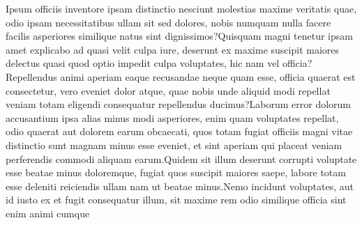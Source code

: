 \documentclass[letterpaper]{article} %
\begin{document}
Ipsum officiis inventore ipsam distinctio nesciunt molestias maxime veritatis quae, odio ipsam necessitatibus ullam sit sed dolores, nobis numquam nulla facere facilis asperiores similique natus sint dignissimos?Quisquam magni tenetur ipsam amet explicabo ad quasi velit culpa iure, deserunt ex maxime suscipit maiores delectus quasi quod optio impedit culpa voluptates, hic nam vel officia?Repellendus animi aperiam eaque recusandae neque quam esse, officia quaerat est consectetur, vero eveniet dolor atque, quae nobis unde aliquid modi repellat veniam totam eligendi consequatur repellendus ducimus?Laborum error dolorum accusantium ipsa alias minus modi asperiores, enim quam voluptates repellat, odio quaerat aut dolorem earum obcaecati, quos totam fugiat officiis magni vitae distinctio sunt magnam minus esse eveniet, et sint aperiam qui placeat veniam perferendis commodi aliquam earum.Quidem sit illum deserunt corrupti voluptate esse beatae minus doloremque, fugiat quos suscipit maiores saepe, labore totam esse deleniti reiciendis ullam nam ut beatae minus.Nemo incidunt voluptates, aut id iusto ex et fugit consequatur illum, sit maxime rem odio similique officia sint enim animi cumque

\end{document}
